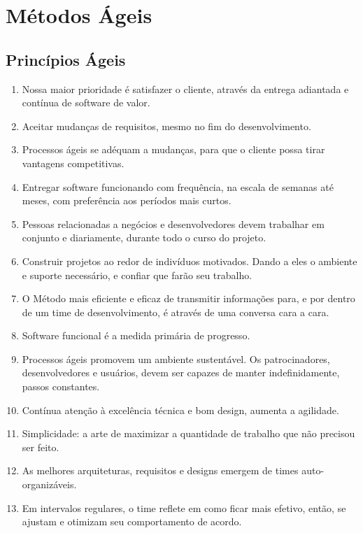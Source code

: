 \chapter{Métodos Ágeis}

\section{Princípios Ágeis}

%
\begin{enumerate}
\item Nossa maior prioridade é satisfazer o cliente, através da entrega adiantada e contínua de software de valor.
\item Aceitar mudanças de requisitos, mesmo no fim do desenvolvimento. \item Processos ágeis se adéquam a mudanças, para que o cliente possa tirar vantagens competitivas.
\item Entregar software funcionando com frequência, na escala de semanas até meses, com preferência aos períodos mais curtos.
\item Pessoas relacionadas a negócios e desenvolvedores devem trabalhar em conjunto e diariamente, durante todo o curso do projeto.
\item Construir projetos ao redor de indivíduos motivados. Dando a eles o ambiente e suporte necessário, e confiar que farão seu trabalho.
\item O Método mais eficiente e eficaz de transmitir informações para, e por dentro de um time de desenvolvimento, é através de uma conversa cara a cara.
\item Software funcional é a medida primária de progresso.
\item Processos ágeis promovem um ambiente sustentável. Os patrocinadores, desenvolvedores e usuários, devem ser capazes de manter indefinidamente, passos constantes.
\item Contínua atenção à excelência técnica e bom design, aumenta a agilidade.
\item Simplicidade: a arte de maximizar a quantidade de trabalho que não precisou ser feito.
\item As melhores arquiteturas, requisitos e designs emergem de times auto-organizáveis.
\item Em intervalos regulares, o time reflete em como ficar mais efetivo, então, se ajustam e otimizam seu comportamento de acordo.
\end{enumerate}